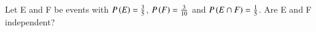\begin{flushleft}
Let E and F be events with $P\left(E\right) = \frac{3}{5}$, $P\left(F\right) = \frac{3}{10}$ and $P\left(E \cap F\right) = \frac{1}{5}$. Are E and F independent?
\end{flushleft}